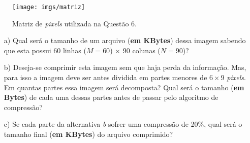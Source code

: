 \documentclass[a4paper,11pt]{article}
\begin{document}
\begin{figure}[H]
\centering
\texttt{[image: imgs/matriz]}
\caption{Matriz de {\it pixels} utilizada na Questão 6.}
\label{fig:matriz}
\end{figure}

\begin{itemize}
    \item [a)] Qual será o tamanho de um arquivo ({\bf em KBytes}) dessa imagem
sabendo que esta possui 60 linhas ($M = 60$) $\times$ 90 colunas ($N = 90$)?
    \item [b)] Deseja-se comprimir esta imagem sem que haja perda da informação.
Mas, para isso a imagem deve ser antes dividida em partes menores de $6 \times
9$ {\it pixels}. Em quantas partes essa imagem será decomposta? Qual será o
tamanho ({\bf em Bytes}) de cada uma dessas partes antes de passar pelo
algoritmo de compressão?
    \item [c)] Se cada parte da alternativa {\it b} sofrer uma compressão de
20\%, qual será o tamanho final ({\bf em KBytes}) do arquivo comprimido?

\end{itemize}

\pagebreak
\end{document}
